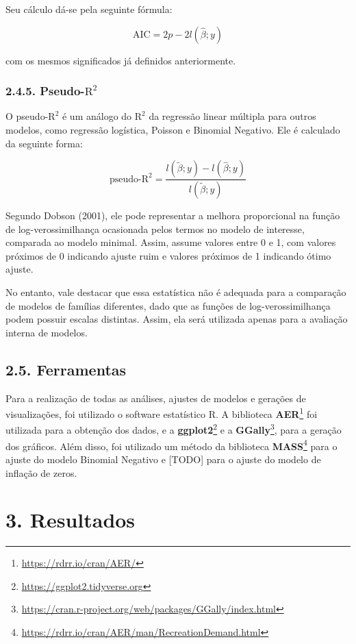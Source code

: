 \documentclass[
]{article}
\begin{document}
Seu cálculo dá-se pela seguinte fórmula:

\[
\text{AIC} = 2p - 2l(\hat{\beta}; y)
\]

com os mesmos significados já definidos anteriormente.

\subsubsection{\texorpdfstring{2.4.5.
Pseudo-\(\text{R}^2\)}{2.4.5. Pseudo-\textbackslash text\{R\}\^{}2}}\label{pseudo-textr2}

O pseudo-\(\text{R}^2\) é um análogo do \(\text{R}^2\) da regressão
linear múltipla para outros modelos, como regressão logística, Poisson e
Binomial Negativo. Ele é calculado da seguinte forma:

\[
\text{pseudo-R}^2 = \dfrac{l(\tilde{\beta}; y) - l(\hat{\beta}; y)}{l(\tilde{\beta}; y)}
\]

Segundo Dobson (2001), ele pode representar a melhora proporcional na
função de log-verossimilhança ocasionada pelos termos no modelo de
interesse, comparada ao modelo minimal. Assim, assume valores entre 0 e
1, com valores próximos de 0 indicando ajuste ruim e valores próximos de
1 indicando ótimo ajuste.

No entanto, vale destacar que essa estatística não é adequada para a
comparação de modelos de famílias diferentes, dado que as funções de
log-verossimilhança podem possuir escalas distintas. Assim, ela será
utilizada apenas para a avaliação interna de modelos.

\subsection{2.5. Ferramentas}\label{ferramentas}

Para a realização de todas as análises, ajustes de modelos e gerações de
visualizações, foi utilizado o software estatístico R. A biblioteca
\textbf{AER}\footnote{\url{https://rdrr.io/cran/AER/}} foi utilizada
para a obtenção dos dados, e a \textbf{ggplot2}\footnote{\url{https://ggplot2.tidyverse.org}}
e a \textbf{GGally}\footnote{\url{https://cran.r-project.org/web/packages/GGally/index.html}},
para a geração dos gráficos. Além disso, foi utilizado um método da
biblioteca \textbf{MASS}\footnote{\url{https://rdrr.io/cran/AER/man/RecreationDemand.html}}
para o ajuste do modelo Binomial Negativo e {[}TODO{]} para o ajuste do
modelo de inflação de zeros.

\section{3. Resultados}\label{resultados}
\end{document}
